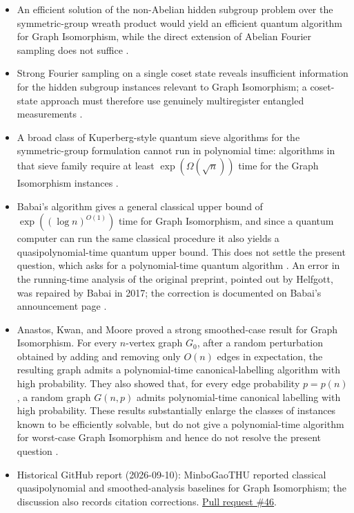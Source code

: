 \begin{itemize}
  \item An efficient solution of the non-Abelian hidden subgroup problem over the
symmetric-group wreath product would yield an efficient quantum algorithm for
Graph Isomorphism, while the direct extension of Abelian Fourier sampling does
not suffice
.

  \item Strong Fourier sampling on a single coset state reveals insufficient
information for the hidden subgroup instances relevant to Graph Isomorphism;
a coset-state approach must therefore use genuinely multiregister entangled
measurements
.

  \item A broad class of Kuperberg-style quantum sieve algorithms for the
symmetric-group formulation cannot run in polynomial time: algorithms in that
sieve family require at least $\exp(\Omega(\sqrt{n}))$ time for the Graph
Isomorphism instances .

  \item Babai's algorithm gives a general classical upper bound of $\exp((\log n)^{O(1)})$ time for Graph Isomorphism, and since a quantum computer can run the same classical procedure it also yields a quasipolynomial-time quantum upper bound.  This does not settle the present question, which asks for a polynomial-time quantum algorithm .  An error in the running-time analysis of the original preprint, pointed out by Helfgott, was repaired by Babai in 2017; the correction is documented on Babai's announcement page .

  \item Anastos, Kwan, and Moore proved a strong smoothed-case result for Graph
Isomorphism.  For every $n$-vertex graph $G_0$, after a random perturbation
obtained by adding and removing only $O(n)$ edges in expectation, the resulting
graph admits a polynomial-time canonical-labelling algorithm with high
probability.  They also showed that, for every edge probability $p=p(n)$, a
random graph $G(n,p)$ admits polynomial-time canonical labelling with high
probability.  These results substantially enlarge the classes of instances
known to be efficiently solvable, but do not give a polynomial-time algorithm
for worst-case Graph Isomorphism and hence do not resolve the present question
.

  \item Historical GitHub report (2026-09-10): MinboGaoTHU reported classical quasipolynomial and smoothed-analysis baselines for Graph Isomorphism; the discussion also records citation corrections. \href{https://github.com/Naixu-Guo/quantum-open-problems/pull/46}{Pull request \#46}.
\end{itemize}

